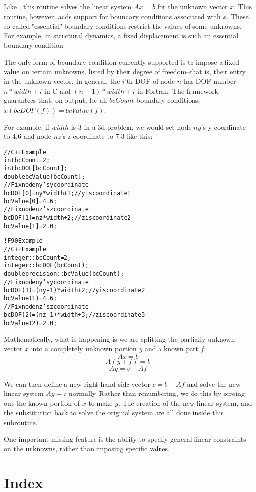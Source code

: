 \documentclass[10pt]{article}
\begin{document}
Like , this routine solves the linear system $A x = b$ for the unknown vector $x$.  This routine, however, adds support for boundary conditions associated with $x$. These so-called "essential" boundary conditions restrict the values of some unknowns. For example, in structural dynamics, a fixed displacement is such an essential boundary condition.  

The only form of boundary condition currently supported is to impose a fixed value on certain unknowns, listed by their degree of freedom--that is, their entry in the unknown vector.  In general, the $i$'th DOF of node $n$ has DOF number $n*width+i$ in C and $(n-1)*width+i$ in Fortran.  The framework guarantees that, on output, for all $bcCount$ boundary conditions, $x(bcDOF(f))=bcValue(f)$.  

For example, if $width$ is 3 in a 3d problem, we would set node $ny$'s y coordinate to 4.6 and node $nz$'s z coordinate to 7.3 like this:

\begin{alltt}
// C++ Example
  int bcCount=2;
  int bcDOF[bcCount];
  double bcValue[bcCount];
  // Fix node ny's y coordinate
  bcDOF[0]=ny*width+1; // y is coordinate 1
  bcValue[0]=4.6;
  // Fix node nz's z coordinate
  bcDOF[1]=nz*width+2; // z is coordinate 2
  bcValue[1]=2.0;

! F90 Example
// C++ Example
  integer :: bcCount=2;
  integer :: bcDOF(bcCount);
  double precision :: bcValue(bcCount);
  // Fix node ny's y coordinate
  bcDOF(1)=(ny-1)*width+2; // y is coordinate 2
  bcValue(1)=4.6;
  // Fix node nz's z coordinate
  bcDOF(2)=(nz-1)*width+3; // z is coordinate 3
  bcValue(2)=2.0;
\end{alltt}



Mathematically, what is happening is we are splitting the partially unknown vector $x$ into a completely unknown portion $y$ and a known part $f$:
\[ A x = b \]
\[ A (y + f) = b \]
\[ A y = b - A f \]

We can then define a new right hand side vector $c=b-A f$ and solve the new linear system $A y=c$ normally.  Rather than renumbering, we do this by zeroing out the known portion of $x$ to make $y$.  The creation of the new linear system, and the substitution back to solve the original system are all done inside this subroutine.

One important missing feature is the ability to specify general linear constraints on the unknowns, rather than imposing specific values.


\section{Index}

\end{document}
